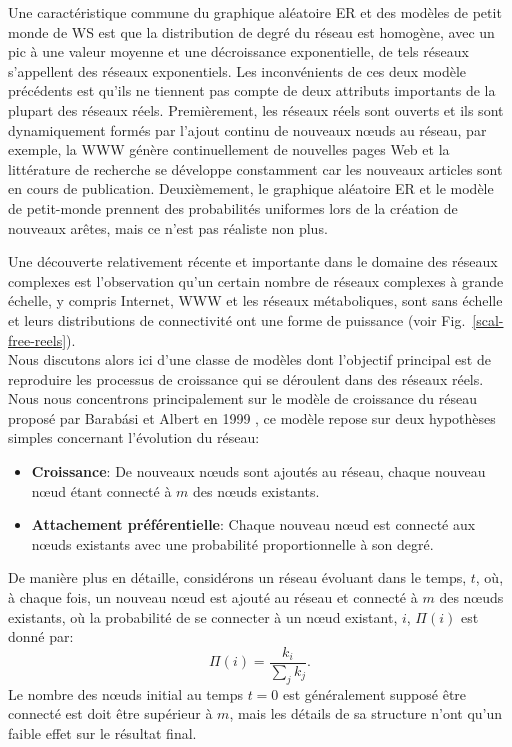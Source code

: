 Une caractéristique commune du graphique aléatoire ER et des modèles de petit monde de WS est que la distribution de degré du réseau est homogène, avec un pic à une valeur moyenne et une décroissance exponentielle, de tels réseaux s'appellent des réseaux exponentiels. Les inconvénients de ces deux modèle précédents est qu'ils ne tiennent pas compte de deux attributs importants de la plupart des réseaux réels.  Premièrement, les réseaux réels sont ouverts et ils sont dynamiquement formés par l'ajout continu de nouveaux nœuds au réseau, par exemple, la WWW génère continuellement de nouvelles pages Web et la littérature de recherche se développe constamment car les nouveaux articles sont en cours de publication. Deuxièmement, le graphique aléatoire ER et le modèle de petit-monde prennent des probabilités uniformes lors de la création de nouveaux arêtes, mais ce n'est pas réaliste non plus.

Une découverte relativement récente et importante dans le domaine des réseaux complexes est l'observation qu'un certain nombre de réseaux complexes à grande échelle, y compris Internet, WWW et les réseaux métaboliques, sont sans échelle et leurs distributions de connectivité ont une forme de puissance (voir Fig.~\ref{scal-free-reels}).\\
Nous discutons alors ici d'une classe de modèles dont l'objectif principal est de reproduire les processus de croissance qui se déroulent dans des réseaux réels. Nous nous concentrons principalement sur le modèle de croissance du réseau proposé par Barabási et Albert en 1999 \cite{BA1999}, ce modèle repose sur deux hypothèses simples concernant l'évolution du réseau:
\begin{itemize}
	\item \textbf{Croissance}: De nouveaux nœuds sont ajoutés au réseau, chaque nouveau nœud étant connecté à $m$ des nœuds existants.
	\item \textbf{Attachement préférentielle}: Chaque nouveau nœud est connecté aux nœuds existants avec une probabilité proportionnelle à son degré.
\end{itemize}
De manière plus en détaille, considérons un réseau évoluant dans le temps, $t$, où, à chaque fois, un nouveau nœud est ajouté au réseau et connecté à $m$ des nœuds existants, où la probabilité de se connecter à un nœud existant,  $i$, $\Pi(i)$ est donné par:
\begin{equation}
\Pi(i)=\dfrac{k_i}{\sum_jk_j}.
\end{equation}
Le nombre des nœuds initial au temps $t=0$ est généralement supposé être connecté est doit être supérieur à $m$, mais les détails de sa structure n'ont qu'un faible effet sur le résultat final.\\

